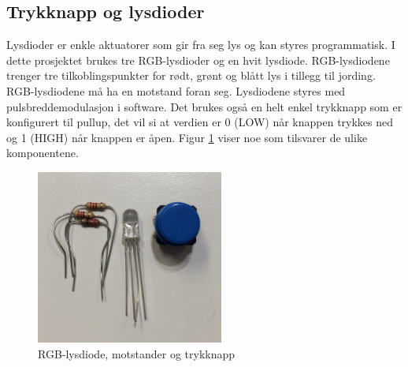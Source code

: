 \subsection{Trykknapp og lysdioder}
Lysdioder er enkle aktuatorer som gir fra seg lys og kan styres programmatisk. I dette prosjektet brukes tre RGB-lysdioder og en hvit lysdiode.
RGB-lysdiodene trenger tre tilkoblingspunkter
for rødt, grønt og blått lys i tillegg til jording. RGB-lysdiodene må ha en motstand foran seg. Lysdiodene styres med pulsbreddemodulasjon i software.
Det brukes også en helt enkel trykknapp som er konfigurert til pullup, det vil si at verdien er 0 (LOW) når knappen trykkes ned
og 1 (HIGH) når knappen er åpen. Figur \ref{fig:lysdioder_motstander} viser noe som tilsvarer de ulike komponentene.

\begin{figure}
\includegraphics[width=0.55\textwidth, center]{fig/prototype/ledmotstandknapp}
\caption{RGB-lysdiode, motstander og trykknapp}
\label{fig:lysdioder_motstander}
\end{figure}
